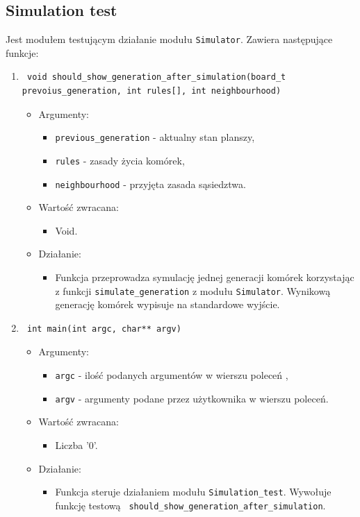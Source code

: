 \documentclass[a4paper,11pt, notitlepage ]{article}
\begin{document}
\subsection{Simulation test}
Jest modułem testującym działanie modułu \verb+Simulator+. Zawiera następujące funkcje:
\begin{enumerate}

\item \begin{verbatim} void should_show_generation_after_simulation(board_t prevoius_generation, int rules[], int neighbourhood) \end{verbatim}
\begin{itemize}
\item Argumenty:
\begin{itemize}
\item \verb+previous_generation+ - aktualny stan planszy,
\item \verb+rules+ - zasady życia komórek,
\item \verb+neighbourhood+ - przyjęta zasada sąsiedztwa.
\end{itemize}
\item Wartość zwracana:
\begin{itemize}
\item Void.
\end{itemize}
\item Działanie:
\begin{itemize}
\item Funkcja przeprowadza symulację jednej generacji komórek korzystając z funkcji \verb+simulate_generation+ z modułu \verb+Simulator+. Wynikową generację komórek wypisuje na standardowe wyjście.
\end{itemize}
\end{itemize}



\item \begin{verbatim} int main(int argc, char** argv) \end{verbatim}
\begin{itemize}
\item Argumenty:
\begin{itemize}
\item \verb+argc+ - ilość podanych argumentów w wierszu poleceń ,
\item \verb+argv+ - argumenty podane przez użytkownika w wierszu poleceń.
\end{itemize}
\item Wartość zwracana:
\begin{itemize}
\item Liczba '0'.
\end{itemize}
\item Działanie:
\begin{itemize}
\item Funkcja steruje działaniem modułu \verb+Simulation_test+. Wywołuje funkcję testową \verb+ should_show_generation_after_simulation+.
\end{itemize}
\end{itemize}


\end{enumerate}
\end{document}
